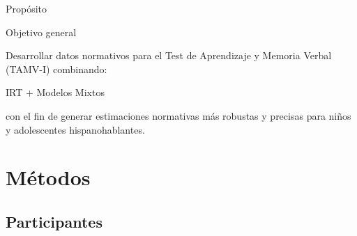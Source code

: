 \documentclass[aspectratio=169]{beamer}
\begin{document}
\begin{frame}{Propósito}
	
	\begin{block}{Objetivo general}
		
		Desarrollar datos normativos para el
		Test de Aprendizaje y Memoria Verbal
		(TAMV-I) combinando:
		
		\begin{center}
			
			\Large
			IRT + Modelos Mixtos
			
		\end{center}
		
		con el fin de generar estimaciones
		normativas más robustas y precisas para
		niños y adolescentes hispanohablantes.
		
	\end{block}
	
\end{frame}

\section{Métodos}
\subsection{Participantes}
\end{document}
